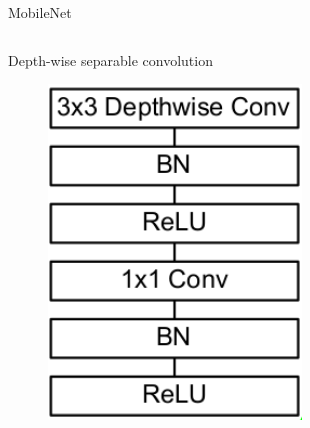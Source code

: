 \documentclass[xcolor=pdftex,dvipsnames,table,mathserif]{beamer}
\begin{document}
\begin{frame}{MobileNet \cite{howard_mobilenets:_2017}}


  \begin{columns}
    \begin{column}{.5\textwidth}
      \begin{block}{Depth-wise separable convolution}
        \begin{figure}[ht]
          \centering
          \includegraphics[width=0.6\textwidth]{dw_separable_conv}
        \end{figure}
      \end{block}

    \end{column}


\end{columns}
\end{frame}
\end{document}

